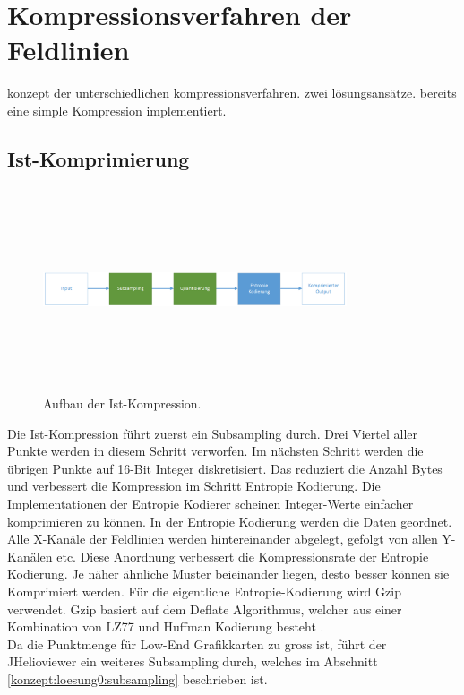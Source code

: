 \section{Kompressionsverfahren der Feldlinien} \label{konzept}
konzept der unterschiedlichen kompressionsverfahren. zwei lösungsansätze. 
bereits eine simple Kompression implementiert.

\subsection{Ist-Komprimierung} \label{konzept:ist-komprimierung}
\begin{figure}[!htbp]
	\center
	\includegraphics[width=0.8\textwidth,height=6cm,keepaspectratio]{./pictures/konzept/ist/aufbau.png}
	\caption{Aufbau der Ist-Kompression.}
	\label{konzept:ist:aufbau:diagramm}
\end{figure} 
Die Ist-Kompression führt zuerst ein Subsampling durch. Drei Viertel aller Punkte werden in diesem Schritt verworfen. Im nächsten Schritt werden die übrigen Punkte  auf 16-Bit Integer diskretisiert. Das reduziert die Anzahl Bytes und verbessert die Kompression im Schritt Entropie Kodierung. Die Implementationen der Entropie Kodierer scheinen Integer-Werte einfacher komprimieren zu können. In der Entropie Kodierung werden die Daten geordnet. Alle X-Kanäle der Feldlinien werden hintereinander abgelegt, gefolgt von allen Y-Kanälen etc. Diese Anordnung verbessert die Kompressionsrate der Entropie Kodierung. Je näher ähnliche Muster beieinander liegen, desto besser können sie Komprimiert werden. Für die eigentliche Entropie-Kodierung wird Gzip verwendet. Gzip basiert auf dem Deflate Algorithmus, welcher aus einer Kombination von LZ77 und Huffman Kodierung besteht \cite{wiki:gzip}.\\
Da die Punktmenge für Low-End Grafikkarten zu gross ist, führt der JHelioviewer ein weiteres Subsampling durch, welches im Abschnitt \ref{konzept:loesung0:subsampling} beschrieben ist.

